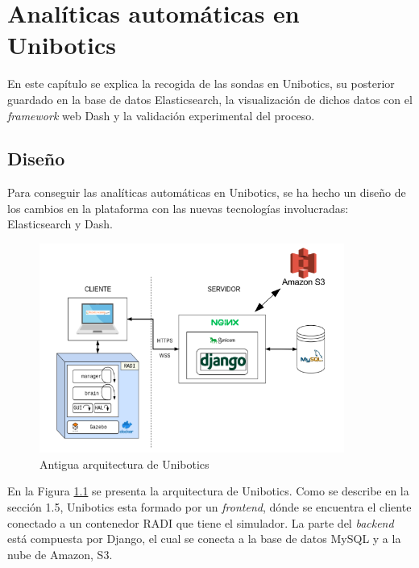 \chapter{Analíticas automáticas en Unibotics}
\label{analiticas}
En este capítulo se explica la recogida de las sondas en Unibotics, su posterior guardado en la base de datos Elasticsearch, la visualización de dichos datos con el \textit{framework} web Dash y la validación experimental del proceso.

\section{Diseño}
Para conseguir las analíticas automáticas en Unibotics, se ha hecho un diseño de los cambios en la plataforma con las nuevas tecnologías involucradas: Elasticsearch y Dash.\\

\begin{figure}[H]
    \centering
    \includegraphics[width=10cm, keepaspectratio]{img/grafico.png}
    \caption{Antigua arquitectura de Unibotics}
    \label{fig:grafico}
\end{figure}

En la Figura \ref{fig:grafico} se presenta la arquitectura de Unibotics. Como se describe en la sección 1.5, Unibotics esta formado por un \textit{frontend}, dónde se encuentra el cliente conectado a un contenedor RADI que tiene el simulador. La parte del \textit{backend}
está compuesta por Django, el cual se conecta a la base de datos MySQL y a la nube de Amazon, S3.

